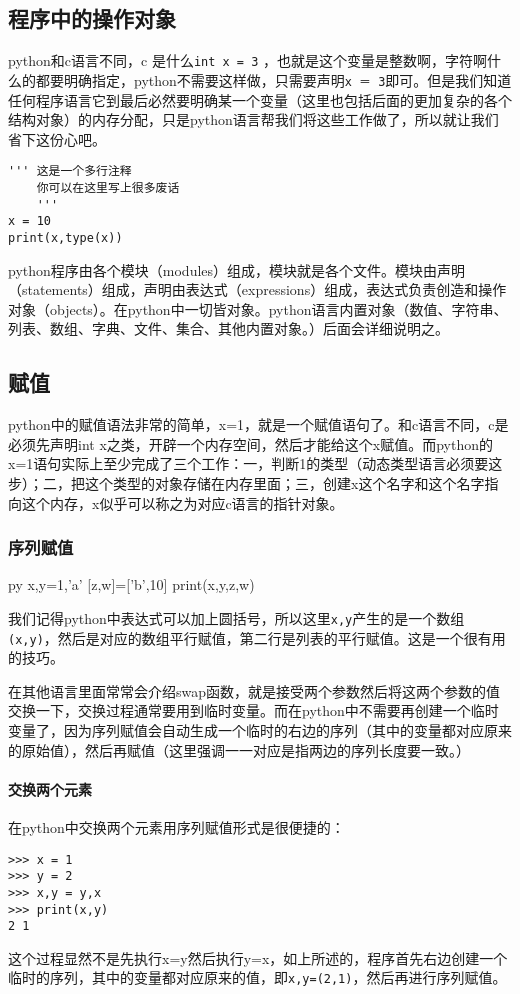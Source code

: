 \documentclass[12pt,oneside]{book}
\begin{document}
\begin{common-format}
\chapter{程序中的操作对象}
python和c语言不同，c 是什么\verb+int x = 3+ ，也就是这个变量是整数啊，字符啊什么的都要明确指定，python不需要这样做，只需要声明\verb+x ＝ 3+即可。但是我们知道任何程序语言它到最后必然要明确某一个变量（这里也包括后面的更加复杂的各个结构对象）的内存分配，只是python语言帮我们将这些工作做了，所以就让我们省下这份心吧。

\begin{Verbatim}
''' 这是一个多行注释
    你可以在这里写上很多废话
    '''
x = 10
print(x,type(x))
\end{Verbatim}

python程序由各个模块（modules）组成，模块就是各个文件。模块由声明（statements）组成，声明由表达式（expressions）组成，表达式负责创造和操作对象（objects）。在python中一切皆对象。python语言内置对象（数值、字符串、列表、数组、字典、文件、集合、其他内置对象。）后面会详细说明之。


\section{赋值}
python中的赋值语法非常的简单，x=1，就是一个赋值语句了。和c语言不同，c是必须先声明int x之类，开辟一个内存空间，然后才能给这个x赋值。而python的x=1语句实际上至少完成了三个工作：一，判断1的类型（动态类型语言必须要这步）；二，把这个类型的对象存储在内存里面；三，创建x这个名字和这个名字指向这个内存，x似乎可以称之为对应c语言的指针对象。

\subsection{序列赋值}
\begin{xverbatim}[129]{py}
x,y=1,'a'
[z,w]=['b',10]
print(x,y,z,w)
\end{xverbatim}

我们记得python中表达式可以加上圆括号，所以这里\verb+x,y+产生的是一个数组\verb+(x,y)+，然后是对应的数组平行赋值，第二行是列表的平行赋值。这是一个很有用的技巧。

在其他语言里面常常会介绍swap函数，就是接受两个参数然后将这两个参数的值交换一下，交换过程通常要用到临时变量。而在python中不需要再创建一个临时变量了，因为序列赋值会自动生成一个临时的右边的序列（其中的变量都对应原来的原始值），然后再赋值（这里强调一一对应是指两边的序列长度要一致。）

\subsubsection{交换两个元素}
在python中交换两个元素用序列赋值形式是很便捷的：
\begin{Verbatim}
>>> x = 1
>>> y = 2
>>> x,y = y,x
>>> print(x,y)
2 1
\end{Verbatim}
这个过程显然不是先执行x=y然后执行y=x，如上所述的，程序首先右边创建一个临时的序列，其中的变量都对应原来的值，即\verb+x,y=(2,1)+，然后再进行序列赋值。




\end{common-format}
\end{document}

